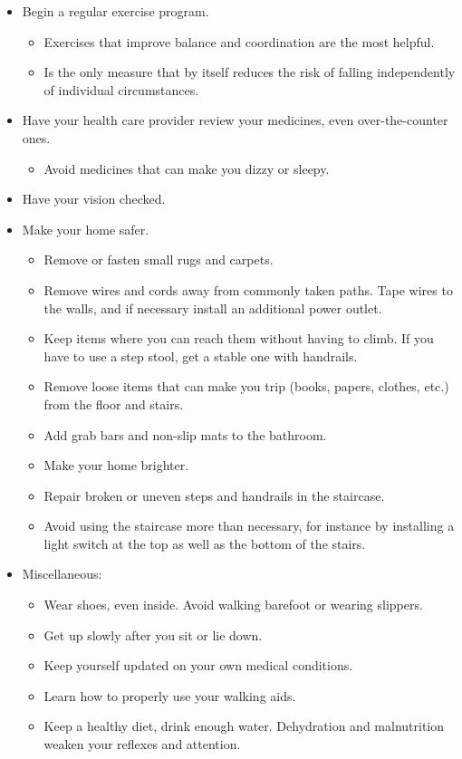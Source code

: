 \begin{itemize}
\item Begin a regular exercise program.
\begin{itemize}
\item Exercises that improve balance and coordination are the most helpful.
\item Is the only measure that by itself reduces the risk of falling independently of individual circumstances. 
\end{itemize}
\item Have your health care provider review your medicines, even over-the-counter ones.
\begin{itemize}
\item Avoid medicines that can make you dizzy or sleepy.
\end{itemize}
\item Have your vision checked.
\item Make your home safer.
\begin{itemize}
\item Remove or fasten small rugs and carpets.
\item Remove wires and cords away from commonly taken paths. Tape wires to the walls, and if necessary install an additional power outlet.
\item Keep items where you can reach them without having to climb. If you have to use a step stool, get a stable one with handrails.
\item Remove loose items that can make you trip (books, papers, clothes, etc.) from the floor and stairs.
\item Add grab bars and non-slip mats to the bathroom.
\item Make your home brighter.
\item Repair broken or uneven steps and handrails in the staircase.
\item Avoid using the staircase more than necessary, for instance by installing a light switch at the top as well as the bottom of the stairs. 
\end{itemize}
\item Miscellaneous:
\begin{itemize}
\item Wear shoes, even inside. Avoid walking barefoot or wearing slippers.
\item Get up slowly after you sit or lie down.
\item Keep yourself updated on your own medical conditions.
\item Learn how to properly use your walking aids.
\item Keep a healthy diet, drink enough water. Dehydration and malnutrition weaken your reflexes and attention.
\end{itemize}
\end{itemize}

